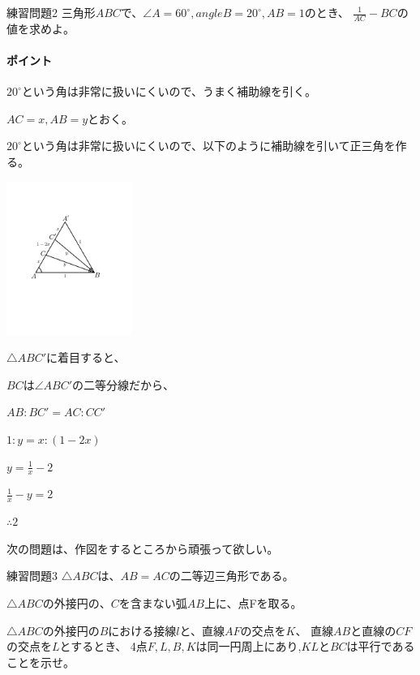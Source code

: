 \documentclass[uplatex,fleqn]{jsbook}
\begin{document}
\begin{problem}{練習問題2}
    三角形$ABC$で、$\angle A=60^\circ,angle B=20^\circ,AB=1$のとき、
    $\displaystyle\frac{1}{AC}-BC$の値を求めよ。
\end{problem}

\paragraph{ポイント} $20^\circ$という角は非常に扱いにくいので、うまく補助線を引く。

\begin{answer}
    $AC=x,AB=y$とおく。

    $20^\circ$という角は非常に扱いにくいので、以下のように補助線を引いて正三角を作る。

    \includegraphics[clip,height=5cm]{figures/practice2.pdf}

    $\triangle ABC'$に着目すると、

    $BC$は$\angle ABC'$の二等分線だから、

    $AB:BC'=AC:CC'$

    $1:y=x:(1-2x)$

    $\displaystyle y = \frac{1}{x}-2$

    $\frac{1}{x}-y=2$

    $\therefore 2$
\end{answer}

次の問題は、作図をするところから頑張って欲しい。

\begin{problem}{練習問題3}
    $\triangle ABC$は、$AB=AC$の二等辺三角形である。

    $\triangle ABC$の外接円の、$C$を含まない弧$AB$上に、点Fを取る。

    $\triangle ABC$の外接円の$B$における接線$l$と、直線$AF$の交点を$K$、
    直線$AB$と直線の$CF$の交点を$L$とするとき、
    4点$F,L,B,K$は同一円周上にあり,$KL$と$BC$は平行であることを示せ。
\end{problem}
\end{document}
